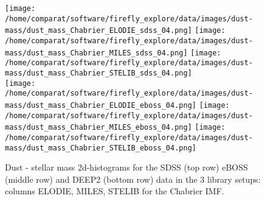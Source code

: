 \documentclass[onecolumn]{aa}
\begin{document}
\begin{figure}
\begin{center}
\caption{\label{fig:distributions:DM} 
Dust - stellar mass 2d-histograms for the SDSS (top row) eBOSS (middle row) and DEEP2 (bottom row) data in the 3 library setups: columns ELODIE, MILES, STELIB for the Chabrier IMF.} 
\texttt{[image: /home/comparat/software/firefly\_explore/data/images/dust-mass/dust\_mass\_Chabrier\_ELODIE\_sdss\_04.png]}
\hspace*{-1.7cm}
\texttt{[image: /home/comparat/software/firefly\_explore/data/images/dust-mass/dust\_mass\_Chabrier\_MILES\_sdss\_04.png]}
\hspace*{-1.7cm}
\texttt{[image: /home/comparat/software/firefly\_explore/data/images/dust-mass/dust\_mass\_Chabrier\_STELIB\_sdss\_04.png]} \\
\vspace*{-1.1cm}
\texttt{[image: /home/comparat/software/firefly\_explore/data/images/dust-mass/dust\_mass\_Chabrier\_ELODIE\_eboss\_04.png]}
\hspace*{-1.7cm}
\texttt{[image: /home/comparat/software/firefly\_explore/data/images/dust-mass/dust\_mass\_Chabrier\_MILES\_eboss\_04.png]}
\hspace*{-1.7cm}
\texttt{[image: /home/comparat/software/firefly\_explore/data/images/dust-mass/dust\_mass\_Chabrier\_STELIB\_eboss\_04.png]}\\
\vspace*{-1.1cm}


\end{center}
\end{figure}
\end{document}
